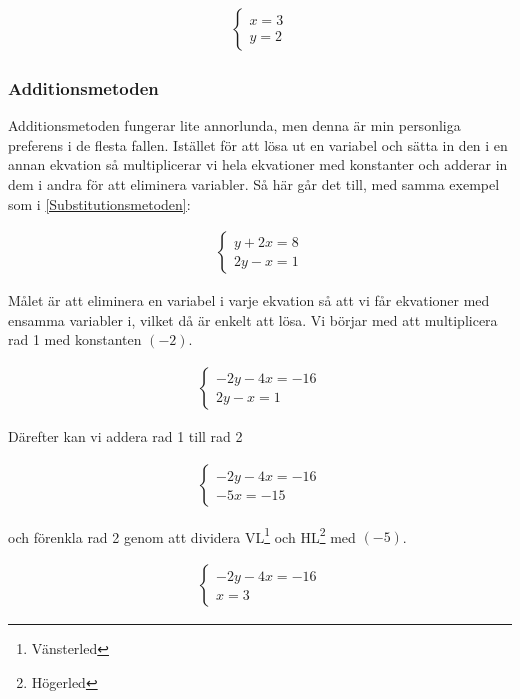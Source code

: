 \begin{align*}
	\begin{cases}
		x = 3 \\
		y = 2
	\end{cases}
\end{align*}

\newpage
\subsubsection{Additionsmetoden}
\label{Additionsmetoden}

Additionsmetoden fungerar lite annorlunda, men denna är min personliga preferens i de flesta fallen. Istället för att lösa ut en variabel och sätta in den i en annan ekvation så multiplicerar vi hela ekvationer med konstanter och adderar in dem i andra för att eliminera variabler. Så här går det till, med samma exempel som i \ref{Substitutionsmetoden}:

\begin{align}
	\begin{cases}
		y+2x=8 \\
		2y-x = 1
	\end{cases}
\end{align}

Målet är att eliminera en variabel i varje ekvation så att vi får ekvationer med ensamma variabler i, vilket då är enkelt att lösa. Vi börjar med att multiplicera rad 1 med konstanten $(-2)$.

\begin{align}
	\begin{cases}
		-2y-4x=-16 \\
		2y-x = 1
	\end{cases}
\end{align}

Därefter kan vi addera rad 1 till rad 2

\begin{align}
	\begin{cases}
		-2y-4x=-16 \\
		-5x = -15
	\end{cases}
\end{align}

och förenkla rad 2 genom att dividera VL\footnote{Vänsterled} och HL\footnote{Högerled} med $(-5)$.

\begin{align}
	\begin{cases}
		-2y-4x=-16 \\
		x = 3
	\end{cases}
\end{align}

